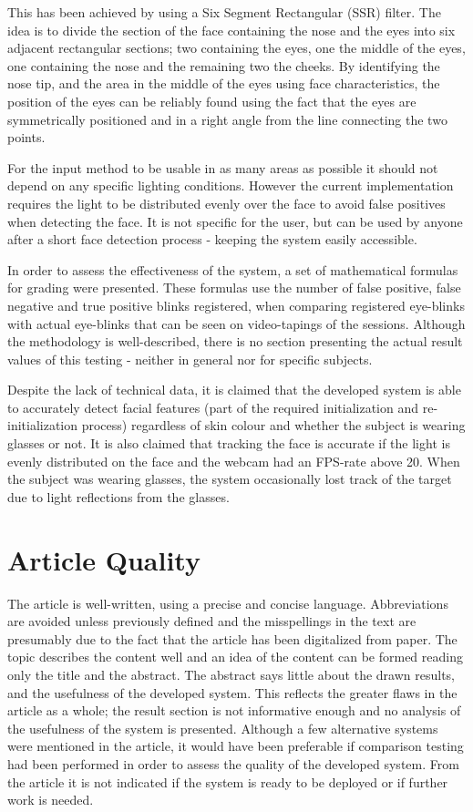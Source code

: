 \documentclass[a4paper,10pt]{article}
\begin{document}
This has been achieved by using a Six Segment Rectangular (SSR) filter\cite{ssr}. The idea is to divide the section of the face containing the nose and the eyes into six adjacent rectangular sections; two containing the eyes, one the middle of the eyes, one containing the nose and the remaining two the cheeks. By identifying the nose tip, and the area in the middle of the eyes using face characteristics, the position of the eyes can be reliably found using the fact that the eyes are symmetrically positioned and in a right angle from the line connecting the two points.

For the input method to be usable in as many areas as possible it should not depend on any specific lighting conditions. However the current implementation requires the light to be distributed evenly over the face to avoid false positives when detecting the face. It is not specific for the user, but can be used by anyone after a short face detection process - keeping the system easily accessible.

In order to assess the effectiveness of the system, a set of mathematical formulas for grading were presented. These formulas use the number of false positive, false negative and true positive blinks registered, when comparing registered eye-blinks with actual eye-blinks that can be seen on video-tapings of the sessions. Although the methodology is well-described, there is no section presenting the actual result values of this testing - neither in general nor for specific subjects.

Despite the lack of technical data, it is claimed that the developed system is able to accurately detect facial features (part of the required initialization and re-initialization process) regardless of skin colour and whether the subject is wearing glasses or not. It is also claimed that tracking the face is accurate if the light is evenly distributed on the face and the webcam had an FPS-rate above 20. When the subject was wearing glasses, the system occasionally lost track of the target due to light reflections from the glasses.

\section{Article Quality}
The article is well-written, using a precise and concise language. Abbreviations are avoided unless previously defined and the misspellings in the text are presumably due to the fact that the article has been digitalized from paper. The topic describes the content well and an idea of the content can be formed reading only the title and the abstract. The abstract says little about the drawn results, and the usefulness of the developed system. This reflects the greater flaws in the article as a whole; the result section is not informative enough and no analysis of the usefulness of the system is presented. Although a few alternative systems were mentioned in the article, it would have been preferable if comparison testing had been performed in order to assess the quality of the developed system. From the article it is not indicated if the system is ready to be deployed or if further work is needed.
\end{document}
